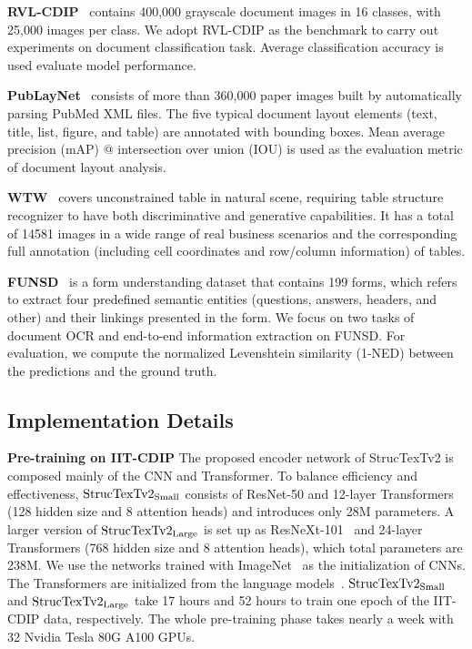 \documentclass{article} %
\begin{document}
\noindent\textbf{RVL-CDIP}~\cite{icdar15cdip} contains 400,000 grayscale document images in 16 classes, with 25,000 images per class. 
We adopt RVL-CDIP as the benchmark to carry out experiments on document classification task. Average classification accuracy is used evaluate model performance.

\noindent\textbf{PubLayNet}~\cite{zhong2019publaynet} consists of more than 360,000 paper images built by automatically parsing PubMed XML files. The five typical document layout elements (text, title, list, figure, and table) are annotated with bounding boxes. Mean average precision (mAP) @ intersection over union (IOU) is used as the evaluation metric of document layout analysis.

\noindent\textbf{WTW}~\cite{long2021parsing} covers unconstrained table in natural scene, requiring table structure recognizer to have both discriminative and generative capabilities. It has a total of 14581 images in a wide range of real business scenarios and the corresponding full annotation (including cell coordinates and row/column information) of tables. 

\noindent\textbf{FUNSD}~\cite{jaume2019funsd} is a form understanding dataset that contains 199 forms, which refers to extract four predefined semantic entities (questions, answers, headers, and other) and their linkings presented in the form. We focus on two tasks of document OCR and end-to-end information extraction on FUNSD. For evaluation, we compute the normalized Levenshtein similarity (1-NED) between the predictions and the ground truth.


\subsection{Implementation Details}
\noindent\textbf{Pre-training on IIT-CDIP} The proposed encoder network of StrucTexTv2 is composed mainly of the CNN and Transformer. To balance efficiency and effectiveness, $\rm StrucTexTv2_{Small}$ consists of ResNet-50 and 12-layer Transformers (128 hidden size and 8 attention heads) and introduces only 28M parameters. A larger version of $\rm StrucTexTv2_{Large}$ is set up as ResNeXt-101~\cite{xie2017aggregated} and 24-layer Transformers (768 hidden size and 8 attention heads), which total parameters are 238M. We use the networks trained with ImageNet~\cite{deng2009imagenet} as the initialization of CNNs. The Transformers are initialized from the language models~\cite{SunWLFTWW20}. 
$\rm StrucTexTv2_{Small}$ and $\rm StrucTexTv2_{Large}$ take 17 hours and 52 hours to train one epoch of the IIT-CDIP data, respectively. The whole pre-training phase takes nearly a week with 32 Nvidia Tesla 80G A100 GPUs.
\end{document}
